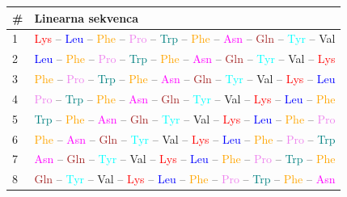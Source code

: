 \documentclass[12pt,oneside]{memoir}
\begin{document}
\begin{table}[h]
\centering
\begin{tabular}{ll}
\toprule
\# & Linearna sekvenca \\
\midrule
1 & \textcolor{red}{Lys} – \textcolor{blue}{Leu} – \textcolor{orange}{Phe} – \textcolor{violet}{Pro} – \textcolor{teal}{Trp} – \textcolor{orange}{Phe} – \textcolor{magenta}{Asn} – \textcolor{brown}{Gln} – \textcolor{cyan}{Tyr} – \textcolor{green!70!black}{Val} \\
2 & \textcolor{blue}{Leu} – \textcolor{orange}{Phe} – \textcolor{violet}{Pro} – \textcolor{teal}{Trp} – \textcolor{orange}{Phe} – \textcolor{magenta}{Asn} – \textcolor{brown}{Gln} – \textcolor{cyan}{Tyr} – \textcolor{green!70!black}{Val} – \textcolor{red}{Lys} \\
3 & \textcolor{orange}{Phe} – \textcolor{violet}{Pro} – \textcolor{teal}{Trp} – \textcolor{orange}{Phe} – \textcolor{magenta}{Asn} – \textcolor{brown}{Gln} – \textcolor{cyan}{Tyr} – \textcolor{green!70!black}{Val} – \textcolor{red}{Lys} – \textcolor{blue}{Leu} \\
4 & \textcolor{violet}{Pro} – \textcolor{teal}{Trp} – \textcolor{orange}{Phe} – \textcolor{magenta}{Asn} – \textcolor{brown}{Gln} – \textcolor{cyan}{Tyr} – \textcolor{green!70!black}{Val} – \textcolor{red}{Lys} – \textcolor{blue}{Leu} – \textcolor{orange}{Phe} \\
5 & \textcolor{teal}{Trp} – \textcolor{orange}{Phe} – \textcolor{magenta}{Asn} – \textcolor{brown}{Gln} – \textcolor{cyan}{Tyr} – \textcolor{green!70!black}{Val} – \textcolor{red}{Lys} – \textcolor{blue}{Leu} – \textcolor{orange}{Phe} – \textcolor{violet}{Pro} \\
6 & \textcolor{orange}{Phe} – \textcolor{magenta}{Asn} – \textcolor{brown}{Gln} – \textcolor{cyan}{Tyr} – \textcolor{green!70!black}{Val} – \textcolor{red}{Lys} – \textcolor{blue}{Leu} – \textcolor{orange}{Phe} – \textcolor{violet}{Pro} – \textcolor{teal}{Trp} \\
7 & \textcolor{magenta}{Asn} – \textcolor{brown}{Gln} – \textcolor{cyan}{Tyr} – \textcolor{green!70!black}{Val} – \textcolor{red}{Lys} – \textcolor{blue}{Leu} – \textcolor{orange}{Phe} – \textcolor{violet}{Pro} – \textcolor{teal}{Trp} – \textcolor{orange}{Phe} \\
8 & \textcolor{brown}{Gln} – \textcolor{cyan}{Tyr} – \textcolor{green!70!black}{Val} – \textcolor{red}{Lys} – \textcolor{blue}{Leu} – \textcolor{orange}{Phe} – \textcolor{violet}{Pro} – \textcolor{teal}{Trp} – \textcolor{orange}{Phe} – \textcolor{magenta}{Asn} \\

\end{tabular}
\end{table}
\end{document}
